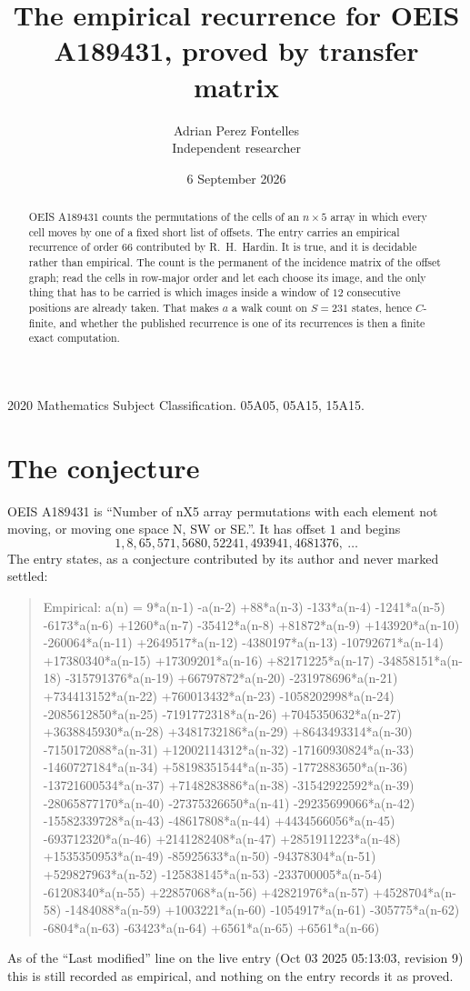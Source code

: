 \documentclass[11pt,a4paper]{article}
\title{The empirical recurrence for OEIS A189431, proved by transfer matrix}
\author{Adrian Perez Fontelles\\ \small Independent researcher}
\date{6 September 2026}
\theoremstyle{plain}
\theoremstyle{definition}
\begin{document}
\maketitle

\begin{abstract}
OEIS A189431 counts the permutations of the cells of an $n\times5$ array in which every cell
moves by one of a fixed short list of offsets. The entry carries an empirical recurrence of
order $66$ contributed by R.~H.~Hardin. It is true, and it is decidable rather than
empirical. The count is the permanent of the incidence matrix of the offset graph; read the
cells in row-major order and let each choose its image, and the only thing that has to be
carried is which images inside a window of $12$ consecutive positions are already taken.
That makes $a$ a walk count on $S=231$ states, hence $C$-finite, and whether the published
recurrence is one of its recurrences is then a finite exact computation.
\end{abstract}

\noindent\small 2020 Mathematics Subject Classification. 05A05, 05A15, 15A15.\normalsize

\section{The conjecture}

OEIS A189431 is ``Number of nX5 array permutations with each element not moving, or moving one space N, SW or SE.''. It has offset $1$ and begins
\[
1, 8, 65, 571, 5680, 52241, 493941, 4681376,\ \dots
\]
The entry states, as a conjecture contributed by its author and never marked settled:
\begin{quote}
Empirical: a(n) = 9*a(n-1) -a(n-2) +88*a(n-3) -133*a(n-4) -1241*a(n-5) -6173*a(n-6) +1260*a(n-7) -35412*a(n-8) +81872*a(n-9) +143920*a(n-10) -260064*a(n-11) +2649517*a(n-12) -4380197*a(n-13) -10792671*a(n-14) +17380340*a(n-15) +17309201*a(n-16) +82171225*a(n-17) -34858151*a(n-18) -315791376*a(n-19) +66797872*a(n-20) -231978696*a(n-21) +734413152*a(n-22) +760013432*a(n-23) -1058202998*a(n-24) -2085612850*a(n-25) -7191772318*a(n-26) +7045350632*a(n-27) +3638845930*a(n-28) +3481732186*a(n-29) +8643493314*a(n-30) -7150172088*a(n-31) +12002114312*a(n-32) -17160930824*a(n-33) -1460727184*a(n-34) +58198351544*a(n-35) -1772883650*a(n-36) -13721600534*a(n-37) +7148283886*a(n-38) -31542922592*a(n-39) -28065877170*a(n-40) -27375326650*a(n-41) -29235699066*a(n-42) -15582339728*a(n-43) -48617808*a(n-44) +4434566056*a(n-45) -693712320*a(n-46) +2141282408*a(n-47) +2851911223*a(n-48) +1535350953*a(n-49) -85925633*a(n-50) -94378304*a(n-51) +529827963*a(n-52) -125838145*a(n-53) -233700005*a(n-54) -61208340*a(n-55) +22857068*a(n-56) +42821976*a(n-57) +4528704*a(n-58) -1484088*a(n-59) +1003221*a(n-60) -1054917*a(n-61) -305775*a(n-62) -6804*a(n-63) -63423*a(n-64) +6561*a(n-65) +6561*a(n-66)
\end{quote}
As of the ``Last modified'' line on the live entry (Oct 03 2025 05:13:03, revision 9) this is still
recorded as empirical, and nothing on the entry records it as proved.
\end{document}
